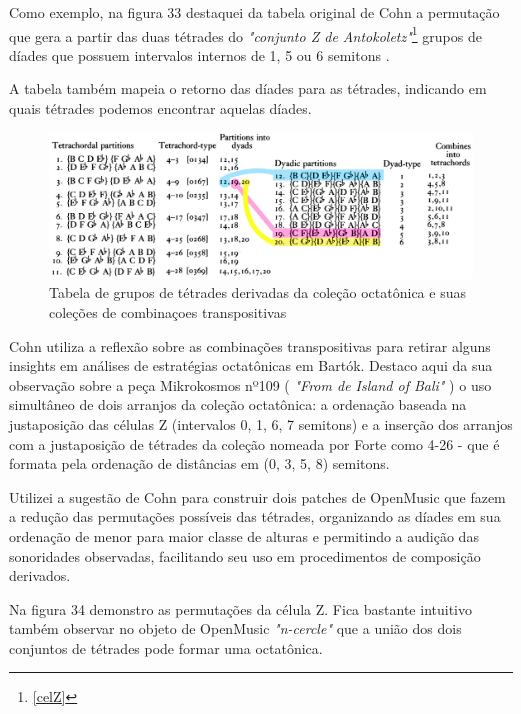 \documentclass[
	12pt,				%
	openright,			%
	twoside,			%
	a4paper,			%
	english,			%
	french,				%
	spanish,			%
	brazil				%
	]{abntex2}
\begin{document}
Como exemplo, na figura 33 destaquei da tabela original de Cohn a permutação que gera a partir das duas tétrades do \textit{"conjunto Z de Antokoletz"}\footnote{ \autoref{celZ}} grupos de díades que possuem intervalos internos de 1, 5 ou 6 semitons .

A tabela também mapeia o retorno das díades para as tétrades, indicando em quais tétrades podemos encontrar aquelas díades.

\begin{figure}[!h]
	\caption{\label{fig_grafico} Tabela de grupos de tétrades derivadas da coleção octatônica e suas coleções de combinaçoes transpositivas}
	\begin{center}
	    \includegraphics[scale=0.28]{octa/Tetrarelations03.png}
	\end{center}
\end{figure}

Cohn utiliza a reflexão sobre as combinações transpositivas para retirar alguns insights em análises de estratégias octatônicas em Bartók. Destaco aqui da sua observação sobre a peça Mikrokosmos nº109 ( \textit{"From de Island of Bali"} ) o uso simultâneo de dois arranjos da coleção octatônica: a ordenação baseada na justaposição das células Z (intervalos 0, 1, 6, 7 semitons) e a inserção dos arranjos com a justaposição de tétrades da coleção nomeada por Forte como 4-26 - que é formata pela ordenação de distâncias em (0, 3, 5, 8)  semitons. 

Utilizei a sugestão de Cohn para construir dois patches de OpenMusic que fazem a redução das permutações possíveis das tétrades, organizando as díades em sua ordenação de menor para maior classe de alturas e permitindo a audição das sonoridades observadas, facilitando seu uso em procedimentos de composição derivados.

Na figura 34 demonstro as permutações da célula Z. Fica bastante intuitivo também observar no objeto de OpenMusic \textit{"n-cercle"} que a união dos dois conjuntos de tétrades pode formar uma octatônica.
\end{document}
